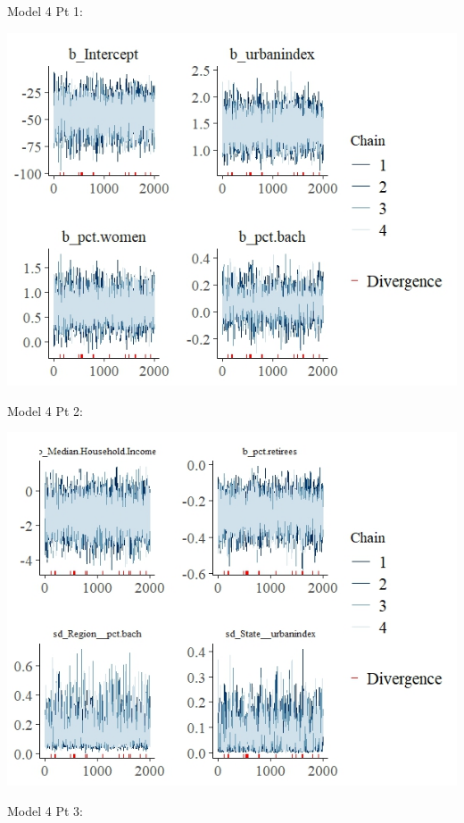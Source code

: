 \documentclass[12pt]{article}
\begin{document}
Model 4 Pt 1:

\includegraphics[scale = 1.3]{trace_plots/trace_model4_part1.jpeg}


Model 4 Pt 2: 

\includegraphics[scale = 1.3]{trace_plots/trace_model4_part2.jpeg}

Model 4 Pt 3: 
\end{document}
